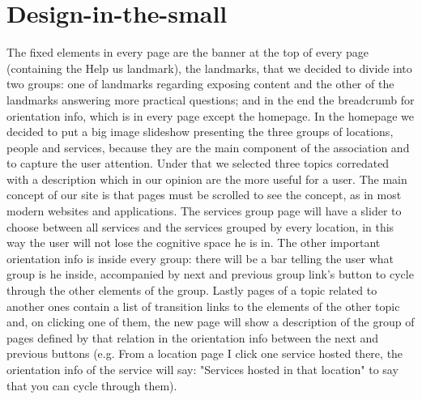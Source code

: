 %
%
\chapter{Design-in-the-small}
%
The fixed elements in every page are the banner at the top of every page (containing the Help us landmark), the landmarks, that we decided to divide into two groups: one of landmarks regarding exposing content and the other of the landmarks answering more practical questions; and in the end the breadcrumb for orientation info, which is in every page except the homepage. In the homepage we decided to put a big image slideshow presenting the three groups of locations, people and services, because they are the main component of the association and to capture the user attention. Under that we selected three topics corredated with a description which in our opinion are the more useful for a user. The main concept of our site is that pages must be scrolled to see the concept, as in most modern websites and applications. The services group page will have a slider to choose between all services and the services grouped by every location, in this way the user will not lose the cognitive space he is in. The other important orientation info is inside every group: there will be a bar telling the user what group is he inside, accompanied by next and previous group link's button to cycle through the other elements of the group. Lastly pages of a topic related to another ones contain a list of transition links to the elements of the other topic and, on clicking one of them, the new page will show a description of the group of pages defined by that relation in the orientation info between the next and previous buttons (e.g. From a location page I click one service hosted there, the orientation info of the service will say: "Services hosted in that location" to say that you can cycle through them).
%
